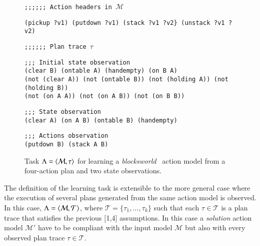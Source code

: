 \begin{figure}[hbt!]
{\footnotesize\tt ;;;;;; Action headers in $\mathcal{M}$}  
\begin{footnotesize}  
\begin{verbatim}
(pickup ?v1) (putdown ?v1) (stack ?v1 ?v2} (unstack ?v1 ?v2)
\end{verbatim}
\end{footnotesize}
\vspace{0.2cm}
{\footnotesize\tt ;;;;;; Plan trace $\tau$}
\begin{footnotesize}
\begin{verbatim}
;;; Initial state observation
(clear B) (ontable A) (handempty) (on B A)
(not (clear A)) (not (ontable B)) (not (holding A)) (not (holding B)) 
(not (on A A)) (not (on A B)) (not (on B B))
\end{verbatim}
\end{footnotesize}

\begin{footnotesize}
\begin{verbatim}
;;; State observation 
(clear A) (on A B) (ontable B) (handempty)
\end{verbatim}
\end{footnotesize}

\begin{footnotesize}
\begin{verbatim}
;;; Actions observation
(putdown B) (stack A B)
\end{verbatim}
\end{footnotesize}


 \caption{\small Task $\Lambda={\langle \mathcal{M},\tau \rangle}$ for learning a {\em blocksworld} \strips\ action model from a four-action plan and two state observations.}
\label{fig:example-plans}
\end{figure}

The definition of the learning task is extensible to the more general case where the execution of several plans generated from the same action model is observed. In this case, $\Lambda={\langle \mathcal{M},\mathcal{T} \rangle}$, where $\mathcal{T}=\{\tau_1,\ldots,\tau_{k}\}$ such that each $\tau\in \mathcal{T}$ is a plan trace that satisfies the previous [1,4] assumptions. In this case a {\em solution} action model $\mathcal{M}'$ have to be compliant with the input model $\mathcal{M}$ but also with every observed plan trace $\tau\in \mathcal{T}$. 


